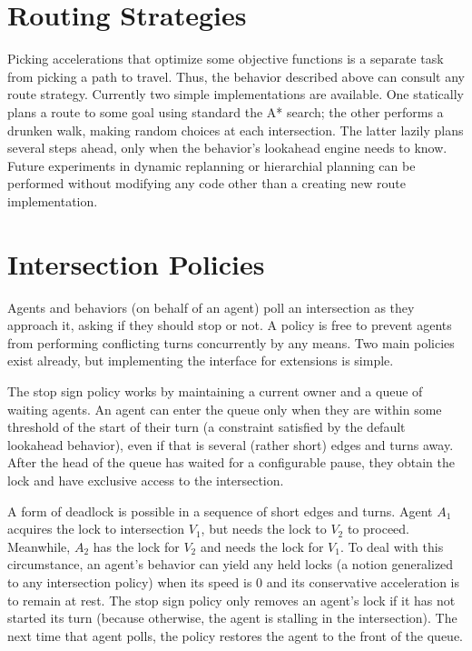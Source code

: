 \documentclass[letterpaper, 10 pt, conference]{ieeeconf}  %
\begin{document}


\section{Routing Strategies}

Picking accelerations that optimize some objective functions is a separate task
from picking a path to travel. Thus, the behavior described above can consult
any route strategy. Currently two simple implementations are available. One
statically plans a route to some goal using standard the A* search; the other
performs a drunken walk, making random choices at each intersection. The latter
lazily plans several steps ahead, only when the behavior's lookahead engine
needs to know. Future experiments in dynamic replanning or hierarchial planning
can be performed without modifying any code other than a creating new route
implementation.

\section{Intersection Policies}

Agents and behaviors (on behalf of an agent) poll an intersection as they
approach it, asking if they should stop or not. A policy is free to prevent
agents from performing conflicting turns concurrently by any means. Two main
policies exist already, but implementing the interface for extensions is simple.

The stop sign policy works by maintaining a current owner and a queue of waiting
agents. An agent can enter the queue only when they are within some threshold of
the start of their turn (a constraint satisfied by the default lookahead
behavior), even if that is several (rather short) edges and turns away. After
the head of the queue has waited for a configurable pause, they obtain the lock
and have exclusive access to the intersection.

A form of deadlock is possible in a sequence of short edges and turns. Agent
$A_1$ acquires the lock to intersection $V_1$, but needs the lock to $V_2$ to
proceed. Meanwhile, $A_2$ has the lock for $V_2$ and needs the lock for $V_1$.
To deal with this circumstance, an agent's behavior can yield any held locks (a
notion generalized to any intersection policy) when its speed is $0$ and its
conservative acceleration is to remain at rest. The stop sign policy only
removes an agent's lock if it has not started its turn (because otherwise, the
agent is stalling in the intersection). The next time that agent polls, the
policy restores the agent to the front of the queue.
\end{document}
